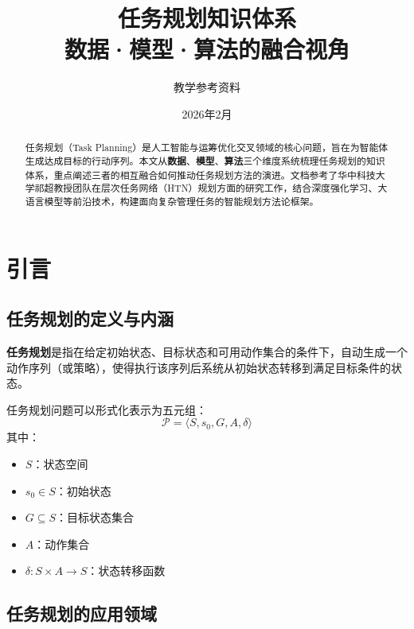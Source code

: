 \documentclass[12pt,a4paper]{ctexart}
\title{\textbf{任务规划知识体系}\\[0.5em]
\large 数据·模型·算法的融合视角}
\author{教学参考资料}
\date{2026年2月}
\begin{document}
\maketitle

\begin{abstract}
任务规划（Task Planning）是人工智能与运筹优化交叉领域的核心问题，旨在为智能体生成达成目标的行动序列。本文从\textbf{数据}、\textbf{模型}、\textbf{算法}三个维度系统梳理任务规划的知识体系，重点阐述三者的相互融合如何推动任务规划方法的演进。文档参考了华中科技大学祁超教授团队在层次任务网络（HTN）规划方面的研究工作，结合深度强化学习、大语言模型等前沿技术，构建面向复杂管理任务的智能规划方法论框架。
\end{abstract}

\tableofcontents
\newpage

\section{引言}

\subsection{任务规划的定义与内涵}

\begin{keypoint}[任务规划的核心定义]
\textbf{任务规划}是指在给定初始状态、目标状态和可用动作集合的条件下，自动生成一个动作序列（或策略），使得执行该序列后系统从初始状态转移到满足目标条件的状态。
\end{keypoint}

任务规划问题可以形式化表示为五元组：
\[ \mathcal{P} = \langle S, s_0, G, A, \delta \rangle \]
其中：
\begin{itemize}[leftmargin=2em]
    \item $S$：状态空间
    \item $s_0 \in S$：初始状态
    \item $G \subseteq S$：目标状态集合
    \item $A$：动作集合
    \item $\delta: S \times A \rightarrow S$：状态转移函数
\end{itemize}

\subsection{任务规划的应用领域}
\end{document}
